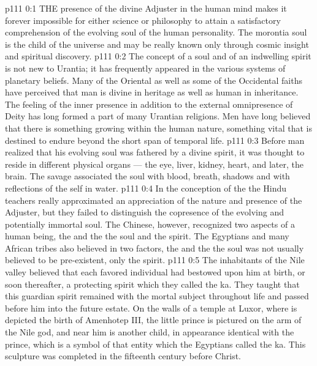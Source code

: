 \vs p111 0:1 THE presence of the divine Adjuster in the human mind makes it forever impossible for either science or philosophy to attain a satisfactory comprehension of the evolving soul of the human personality. The morontia soul is the child of the universe and may be really known only through cosmic insight and spiritual discovery.
\vs p111 0:2 \pc The concept of a soul and of an indwelling spirit is not new to Urantia; it has frequently appeared in the various systems of planetary beliefs. Many of the Oriental as well as some of the Occidental faiths have perceived that man is divine in heritage as well as human in inheritance. The feeling of the inner presence in addition to the external omnipresence of Deity has long formed a part of many Urantian religions. Men have long believed that there is something growing within the human nature, something vital that is destined to endure beyond the short span of temporal life.
\vs p111 0:3 Before man realized that his evolving soul was fathered by a divine spirit, it was thought to reside in different physical organs --- the eye, liver, kidney, heart, and later, the brain. The savage associated the soul with blood, breath, shadows and with reflections of the self in water.
\vs p111 0:4 In the conception of the  the Hindu teachers really approximated an appreciation of the nature and presence of the Adjuster, but they failed to distinguish the copresence of the evolving and potentially immortal soul. The Chinese, however, recognized two aspects of a human being, the  and the  the soul and the spirit. The Egyptians and many African tribes also believed in two factors, the  and the  the soul was not usually believed to be pre\hyp{}existent, only the spirit.
\vs p111 0:5 The inhabitants of the Nile valley believed that each favored individual had bestowed upon him at birth, or soon thereafter, a protecting spirit which they called the ka. They taught that this guardian spirit remained with the mortal subject throughout life and passed before him into the future estate. On the walls of a temple at Luxor, where is depicted the birth of Amenhotep III, the little prince is pictured on the arm of the Nile god, and near him is another child, in appearance identical with the prince, which is a symbol of that entity which the Egyptians called the ka. This sculpture was completed in the fifteenth century before Christ.

